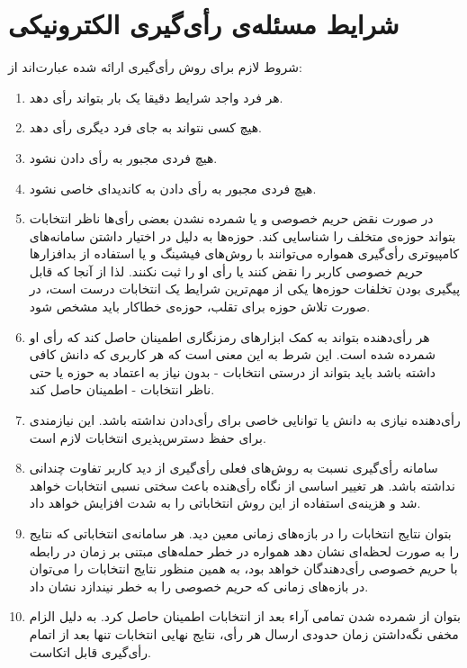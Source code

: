 \section{شرایط مسئله‌ی رأی‌گیری الکترونیکی}
شروط لازم برای روش‌ رأی‌گیری ارائه شده عبارت‌اند از:  
\begin{enumerate}
	\item 
	هر فرد واجد شرایط دقیقا یک بار بتواند رأی دهد.
	\item 
	هیچ کسی نتواند به جای فرد دیگری رأی دهد.
	\item 
	هیچ فردی مجبور به رأی دادن نشود.
	\item 
	هیچ فردی مجبور به رأی دادن به کاندیدای خاصی نشود.
	\item 
	در صورت نقض حریم خصوصی و یا شمرده نشدن بعضی رأی‌ها ناظر انتخابات بتواند حوزه‌ی متخلف را شناسایی کند. حوزه‌ها به دلیل در اختیار داشتن سامانه‌های کامپیوتری رأی‌گیری همواره می‌توانند با روش‌های فیشینگ
	و یا استفاده از بد‌افزار‌ها حریم خصوصی کاربر را نقض کنند یا رأی او را ثبت نکنند. لذا از آنجا که قابل پیگیری بودن تخلفات حوزه‌ها یکی از مهم‌ترین شرایط یک انتخابات درست است، در صورت تلاش حوزه برای تقلب، حوزه‌ی خطاکار باید مشخص شود.
	\item 
	هر رأی‌دهنده بتواند به کمک ابزارهای رمزنگاری اطمینان حاصل کند که رأی او شمرده شده است. این شرط به این معنی است که هر کاربری که دانش کافی داشته باشد باید بتواند از درستی انتخابات - بدون نیاز به اعتماد به حوزه یا حتی ناظر انتخابات - اطمینان حاصل کند. 
	\item
	رأی‌دهنده نیازی به دانش یا توانایی خاصی برای رأی‌دادن نداشته باشد. این نیازمندی برای حفظ دسترس‌پذیری انتخابات لازم است.
	\item
	سامانه رأی‌گیری نسبت به روش‌های فعلی رأی‌گیری از دید کاربر تفاوت چندانی نداشته باشد. هر تغییر اساسی از نگاه رأی‌هنده باعث سختی نسبی انتخابات خواهد شد و هزینه‌ی  استفاده از این روش انتخاباتی را به شدت افزایش خواهد داد.
	\item 
	بتوان نتایج انتخابات را در بازه‌های زمانی معین دید. هر سامانه‌ی انتخاباتی که نتایج را به صورت لحظه‌ای نشان دهد همواره در خطر حمله‌های مبتنی بر زمان در رابطه با حریم خصوصی رأی‌دهندگان خواهد بود، به همین منظور نتایج انتخابات را می‌توان در بازه‌های زمانی که حریم خصوصی را به خطر نیندازد نشان داد.
	\item 
	بتوان از شمرده شدن تمامی آراء بعد از انتخابات اطمینان حاصل کرد. به دلیل الزام مخفی نگه‌داشتن زمان حدودی ارسال هر رأی، نتایج نهایی انتخابات تنها بعد از اتمام رأی‌گیری قابل اتکاست.
\end{enumerate}

